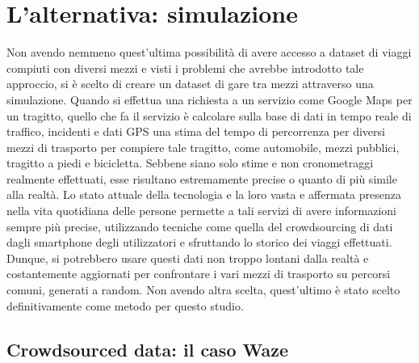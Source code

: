 \section{L'alternativa: simulazione}

Non avendo nemmeno quest'ultima possibilità di avere accesso a dataset di viaggi compiuti con diversi mezzi e visti i problemi che avrebbe introdotto tale approccio, si è scelto di creare un dataset di gare tra mezzi attraverso una simulazione. Quando si effettua una richiesta a un servizio come Google Maps per un tragitto, quello che fa il servizio è calcolare sulla base di dati in tempo reale di traffico, incidenti e dati GPS una stima del tempo di percorrenza per diversi mezzi di trasporto per compiere tale tragitto, come automobile, mezzi pubblici, tragitto a piedi e bicicletta. Sebbene siano solo stime e non cronometraggi realmente effettuati, esse risultano estremamente precise o quanto di più simile alla realtà. Lo stato attuale della tecnologia e la loro vasta e affermata presenza nella vita quotidiana delle persone permette a tali servizi di avere informazioni sempre più precise, utilizzando tecniche come quella del crowdsourcing di dati dagli smartphone degli utilizzatori e sfruttando lo storico dei viaggi effettuati. Dunque, si potrebbero usare questi dati non troppo lontani dalla realtà e costantemente aggiornati per confrontare i vari mezzi di trasporto su percorsi comuni, generati a random. Non avendo altra scelta, quest'ultimo è stato scelto definitivamente come metodo per questo studio.

\subsection{Crowdsourced data: il caso Waze}


